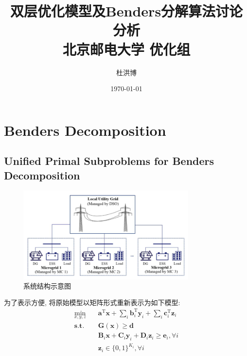 \documentclass{article}
\author{杜洪博}
\title{双层优化模型及Benders分解算法讨论分析 \\ {\small 北京邮电大学 优化组}}
\date{\today}
\begin{document}
\maketitle

\section{Benders Decomposition}
\subsection{Unified Primal Subproblems for Benders Decomposition}
\begin{figure}[htbp]
    \centering
    \includegraphics[width=0.8\textwidth]{./pic/NetworkedStructure.png}
    \caption{系统结构示意图}
    \label{fig:structure}
\end{figure}

为了表示方便, 将原始模型以矩阵形式重新表示为如下模型:
\begin{subequations}
    \begin{align}
        \min_{x, y, z}\quad &\mathbf{a}^\mathrm{T}\mathbf{x}+\sum_i\mathbf{b}_i^\mathrm{T}\mathbf{y}_i+\sum_i\mathbf{c}_i^\mathrm{T}\mathbf{z}_i \label{primal_a}\\
        \mathbf{s.t.}\quad & \mathbf{G}(\mathbf{x})\geq\mathbf{d} \label{primal_b} \\
        &\mathbf{B}_{i}\mathbf{x}+\mathbf{C}_{i}\mathbf{y}_{i}+\mathbf{D}_{i}\mathbf{z}_{i}\geq\mathbf{e}_{i}, \forall i \label{primal_c} \\
        &\mathbf{z}_{i}\in\{0, 1\}^{K_{i}}, \forall i \label{primal_d}
    \end{align}
\end{subequations}
\end{document}
